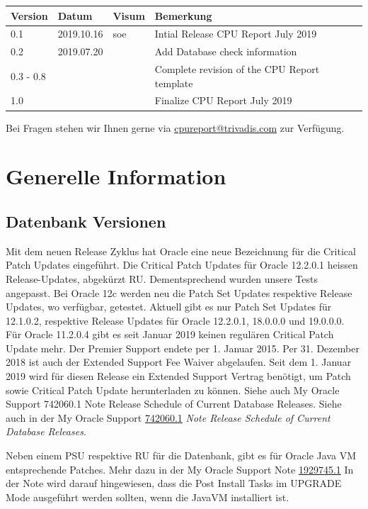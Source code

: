 \begin{longtable}[]{@{}llll@{}}
\toprule
Version & Datum & Visum & Bemerkung\tabularnewline
\midrule
\endhead
0.1 & 2019.10.16 & soe & Intial Release CPU Report July
2019\tabularnewline
0.2 & 2019.07.20 & & Add Database check information\tabularnewline
0.3 - 0.8 & & & Complete revision of the CPU Report
template\tabularnewline
1.0 & & & Finalize CPU Report July 2019\tabularnewline
\bottomrule
\end{longtable}

Bei Fragen stehen wir Ihnen gerne via \url{cpureport@trivadis.com} zur
Verfügung.

\hypertarget{generelle-information}{%
\section{Generelle Information}\label{generelle-information}}

\hypertarget{datenbank-versionen}{%
\subsection{Datenbank Versionen}\label{datenbank-versionen}}

Mit dem neuen Release Zyklus hat Oracle eine neue Bezeichnung für die
Critical Patch Updates eingeführt. Die Critical Patch Updates für Oracle
12.2.0.1 heissen Release-Updates, abgekürzt RU. Dementsprechend wurden
unsere Tests angepasst. Bei Oracle 12c werden neu die Patch Set Updates
respektive Release Updates, wo verfügbar, getestet. Aktuell gibt es nur
Patch Set Updates für 12.1.0.2, respektive Release Updates für Oracle
12.2.0.1, 18.0.0.0 und 19.0.0.0. Für Oracle 11.2.0.4 gibt es seit Januar
2019 keinen regulären Critical Patch Update mehr. Der Premier Support
endete per 1. Januar 2015. Per 31. Dezember 2018 ist auch der Extended
Support Fee Waiver abgelaufen. Seit dem 1. Januar 2019 wird für diesen
Release ein Extended Support Vertrag benötigt, um Patch sowie Critical
Patch Update herunterladen zu können. Siehe auch My Oracle Support
742060.1 Note Release Schedule of Current Database Releases. Siehe auch
in der My Oracle Support
\href{https://support.oracle.com/epmos/faces/DocumentDisplay?id=742060.1}{742060.1}
\emph{Note Release Schedule of Current Database Releases}.

Neben einem PSU respektive RU für die Datenbank, gibt es für Oracle Java
VM entsprechende Patches. Mehr dazu in der My Oracle Support Note
\href{https://support.oracle.com/epmos/faces/DocumentDisplay?id=1929745.1}{1929745.1}
In der Note wird darauf hingewiesen, dass die Post Install Tasks im
UPGRADE Mode ausgeführt werden sollten, wenn die JavaVM installiert ist.

